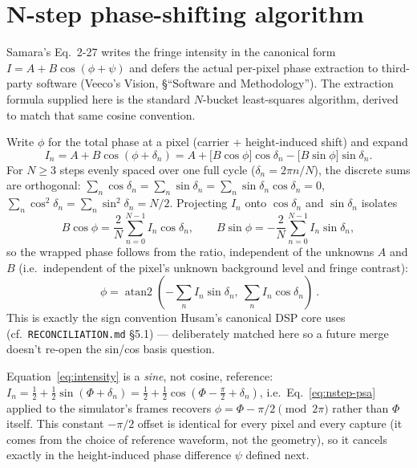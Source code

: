 \documentclass[11pt]{article}
\begin{document}
\section{N-step phase-shifting algorithm}
\label{sec:nstep-psa}

Samara's Eq.~2-27 writes the fringe intensity in the canonical form
$I = A + B\cos(\phi+\psi)$ and defers the actual per-pixel phase extraction
to third-party software (Veeco's Vision, \S ``Software and Methodology'').
The extraction formula supplied here is the standard $N$-bucket
least-squares algorithm, derived to match that same cosine convention.

Write $\phi$ for the total phase at a pixel (carrier + height-induced
shift) and expand
\begin{equation}
  I_n = A + B\cos(\phi+\delta_n) = A + \bigl[B\cos\phi\bigr]\cos\delta_n - \bigl[B\sin\phi\bigr]\sin\delta_n .
\end{equation}
For $N \geq 3$ steps evenly spaced over one full cycle
($\delta_n = 2\pi n/N$), the discrete sums are orthogonal:
$\sum_n \cos\delta_n = \sum_n \sin\delta_n = \sum_n \sin\delta_n\cos\delta_n = 0$,
$\sum_n \cos^2\delta_n = \sum_n \sin^2\delta_n = N/2$. Projecting $I_n$ onto
$\cos\delta_n$ and $\sin\delta_n$ isolates
\begin{equation}
  B\cos\phi = \frac{2}{N}\sum_{n=0}^{N-1} I_n\cos\delta_n, \qquad
  B\sin\phi = -\frac{2}{N}\sum_{n=0}^{N-1} I_n\sin\delta_n,
\end{equation}
so the wrapped phase follows from the ratio, independent of the unknowns
$A$ and $B$ (i.e.\ independent of the pixel's unknown background level and
fringe contrast):
\begin{equation}
  \boxed{\ \phi = \operatorname{atan2}\!\left(-\sum_n I_n \sin\delta_n,\ \sum_n I_n \cos\delta_n\right)\ }.
  \label{eq:nstep-psa}
\end{equation}
This is exactly the sign convention Husam's canonical DSP core uses
(cf.\ \texttt{RECONCILIATION.md} \S5.1) --- deliberately matched here so a
future merge doesn't re-open the sin/cos basis question.

Equation~\ref{eq:intensity} is a \emph{sine}, not cosine, reference: $I_n =
\frac12+\frac12\sin(\Phi+\delta_n) = \frac12+\frac12\cos(\Phi-\frac\pi2+\delta_n)$,
i.e.\ Eq.~\ref{eq:nstep-psa} applied to the simulator's frames recovers
$\phi = \Phi - \pi/2 \pmod{2\pi}$ rather than $\Phi$ itself. This constant
$-\pi/2$ offset is identical for every pixel and every capture (it comes
from the choice of reference waveform, not the geometry), so it cancels
exactly in the height-induced phase difference $\psi$ defined next.
\end{document}
